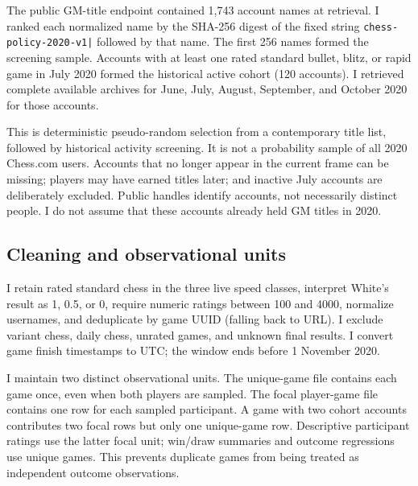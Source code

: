 \documentclass[11pt,a4paper]{article}
\begin{document}
The public GM-title endpoint contained 1,743 account names at retrieval. I ranked each normalized name by the SHA-256 digest of the fixed string \texttt{chess-policy-2020-v1|} followed by that name. The first 256 names formed the screening sample. Accounts with at least one rated standard bullet, blitz, or rapid game in July 2020 formed the historical active cohort (120 accounts). I retrieved complete available archives for June, July, August, September, and October 2020 for those accounts.

This is deterministic pseudo-random selection from a contemporary title list, followed by historical activity screening. It is not a probability sample of all 2020 Chess.com users. Accounts that no longer appear in the current frame can be missing; players may have earned titles later; and inactive July accounts are deliberately excluded. Public handles identify accounts, not necessarily distinct people. I do not assume that these accounts already held GM titles in 2020.

\subsection{Cleaning and observational units}

I retain rated standard chess in the three live speed classes, interpret White's result as 1, 0.5, or 0, require numeric ratings between 100 and 4000, normalize usernames, and deduplicate by game UUID (falling back to URL). I exclude variant chess, daily chess, unrated games, and unknown final results. I convert game finish timestamps to UTC; the window ends before 1 November 2020.

I maintain two distinct observational units. The unique-game file contains each game once, even when both players are sampled. The focal player-game file contains one row for each sampled participant. A game with two cohort accounts contributes two focal rows but only one unique-game row. Descriptive participant ratings use the latter focal unit; win/draw summaries and outcome regressions use unique games. This prevents duplicate games from being treated as independent outcome observations.
\end{document}
